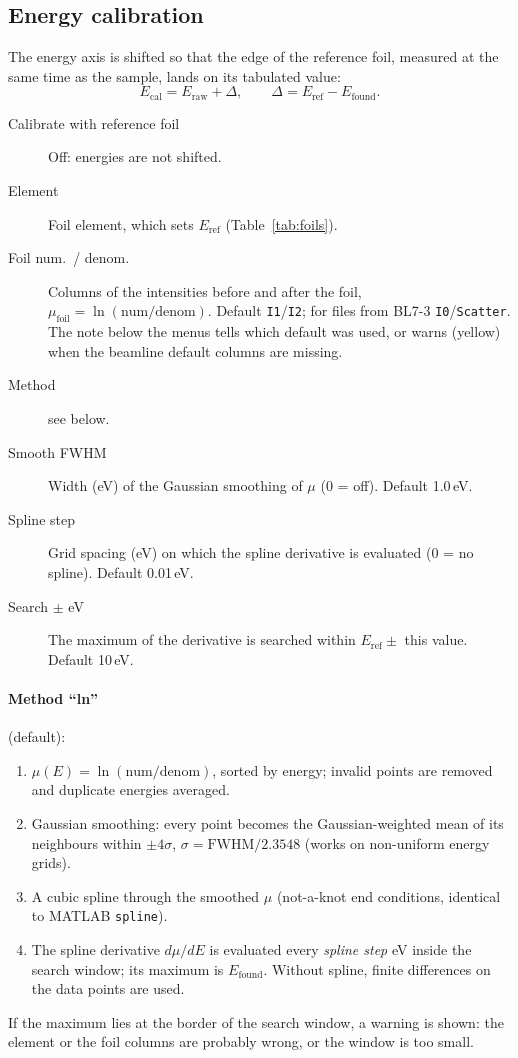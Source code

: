 \documentclass[11pt,a4paper]{article}
\newcommand{\col}[1]{\texttt{#1}}                  %
\begin{document}
\subsection{Energy calibration}
The energy axis is shifted so that the edge of the reference foil, measured at the
same time as the sample, lands on its tabulated value:
\[
  E_\text{cal} = E_\text{raw} + \Delta, \qquad \Delta = E_\text{ref} - E_\text{found}.
\]
\begin{description}
  \item[Calibrate with reference foil] Off: energies are not shifted.
  \item[Element] Foil element, which sets $E_\text{ref}$ (Table~\ref{tab:foils}).
  \item[Foil num.\ / denom.] Columns of the intensities before and after the foil,
        $\mu_\text{foil} = \ln(\text{num}/\text{denom})$. Default \col{I1}/\col{I2}; for files from BL7-3
        \col{I0}/\col{Scatter}. The note below the menus tells which default was used, or warns (yellow) when the
        beamline default columns are missing.
  \item[Method] see below.
  \item[Smooth FWHM] Width (eV) of the Gaussian smoothing of $\mu$ (0 = off). Default 1.0\,eV.
  \item[Spline step] Grid spacing (eV) on which the spline derivative is evaluated (0 = no spline).
        Default 0.01\,eV.
  \item[Search $\pm$ eV] The maximum of the derivative is searched within $E_\text{ref}\pm$ this value.
        Default 10\,eV.
\end{description}

\paragraph{Method ``ln''} (default):
\begin{enumerate}
  \item $\mu(E)=\ln(\text{num}/\text{denom})$, sorted by energy; invalid points are removed and duplicate
        energies averaged.
  \item Gaussian smoothing: every point becomes the Gaussian-weighted mean of its neighbours within
        $\pm4\sigma$, $\sigma = \text{FWHM}/2.3548$ (works on non-uniform energy grids).
  \item A cubic spline through the smoothed $\mu$ (not-a-knot end conditions, identical to MATLAB
        \texttt{spline}).
  \item The spline derivative $d\mu/dE$ is evaluated every \emph{spline step} eV inside the search window;
        its maximum is $E_\text{found}$. Without spline, finite differences on the data points are used.
\end{enumerate}
If the maximum lies at the border of the search window, a warning is shown: the
element or the foil columns are probably wrong, or the window is too small.
\end{document}
